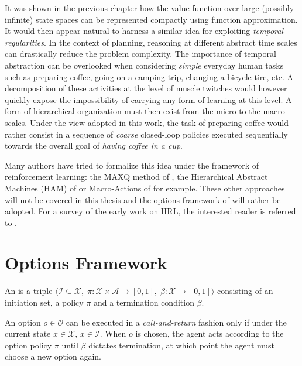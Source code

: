 It was shown in the previous chapter how the value function over large 
(possibly infinite)
state spaces can be represented compactly using function approximation. It would
then appear natural to harness a similar idea for exploiting \textit{temporal
regularities}. In the context of planning, reasoning at different
abstract time scales can drastically reduce the problem complexity.
The importance of temporal abstraction can be overlooked when considering \textit{simple} everyday
human tasks such as preparing coffee, going on a camping trip, changing a bicycle tire,
etc. A decomposition of these activities at the level of muscle twitches would however quickly expose 
the impossibility of carrying any form of learning at this level. A form of hierarchical organization must then exist from the micro to the macro-scales. Under the view adopted in this work, the task of preparing coffee would rather consist in a sequence of \textit{coarse} closed-loop policies executed sequentially towards the overall goal of \textit{having coffee in a cup}. 

Many authors have tried to formalize this idea under the framework
of reinforcement learning: the \textsc{MAXQ} method of \cite{Dietterich1998}, the Hierarchical
Abstract Machines (HAM) of \cite{Parr1997} or Macro-Actions of \cite{Hauskrecht1998} for
example. These other approaches will not be covered in this thesis and the options framework of 
\cite{Sutton1999} will rather be adopted. For a survey of the early work on HRL, the
interested reader is referred to \cite{StolleThesis2004, Sutton1999}.

\section{Options Framework}
\begin{defn}
An  is a triple $\langle \mathcal{I} \subseteq \mathcal{X},\;
\mathcal{\pi} : \mathcal{X} \times \mathcal{A} \to [0, 1],\; \beta : \mathcal{X} \to [0, 1]
\rangle$ consisting of an initiation set, a policy $\pi$ and a termination condition
$\beta$.
\end{defn}

An option $o \in \mathcal{O}$ can be executed in a \textit{call-and-return} fashion only if under the current state $x \in \mathcal{X}$, $x \in \mathcal{I}$. When $o$ is chosen, the agent acts according to the option policy $\pi$ until  $\beta$ dictates termination, at which point the agent must choose a new option again.

